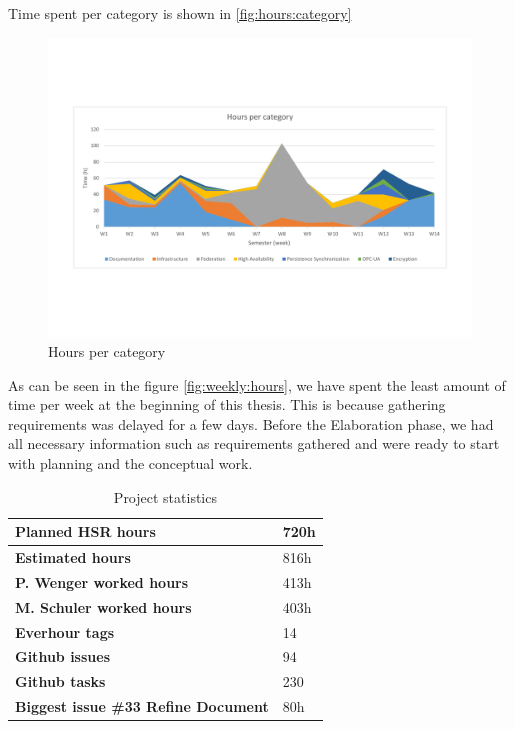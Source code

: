Time spent per category is shown in \autoref{fig:hours:category}
\begin{figure}[]
	\includegraphics[trim=2cm 5cm 2cm 5.9cm, clip=true, width=\textwidth]{img/project_monitoring_weekly_hours_per_category.pdf}
	\caption{Hours per category}
	\label{fig:hours:category}
\end{figure}

As can be seen in the figure \autoref{fig:weekly:hours}, we have spent the
least amount of time per week at the beginning of this thesis. This is because
gathering requirements was delayed for a few days. Before the Elaboration
phase, we had all necessary information such as requirements gathered and were
ready to start with planning and the conceptual work.


\begin{table}[H]
  \centering
  \begin{tabular}{|p{100mm}|p{35mm}|}
    \hline 	\bf Planned HSR hours & 720h \\ \hline
	\bf Estimated hours & 816h \\ \hline
	\bf P. Wenger worked hours & 413h \\ \hline
	\bf M. Schuler worked hours & 403h \\ \hline
	\bf Everhour tags & 14 \\ \hline
	\bf Github issues & 94 \\ \hline
	\bf Github tasks & 230 \\ \hline
	\bf Biggest issue \#33 Refine Document & 80h \\ \hline
  \end{tabular} \\
  \caption{Project statistics}
  \label{tab:projectstats}
\end{table}


